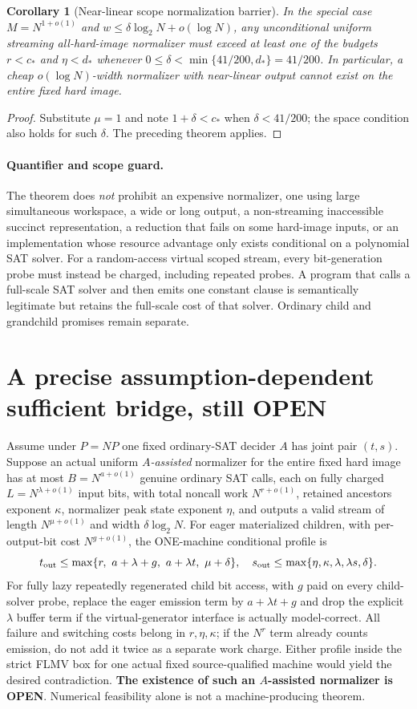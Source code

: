 \documentclass[11pt]{article}
\newtheorem{corollary}[theorem]{Corollary}
\begin{document}
\begin{corollary}[Near-linear scope normalization barrier]
In the special case $M=N^{1+o(1)}$ and
$w\le\delta\log_2N+o(\log N)$, any unconditional
uniform streaming all-hard-image normalizer must exceed at least
one of the budgets $r<c_*$ and $\eta<d_*$ whenever
$0\le\delta<\min\{41/200,d_*\}=41/200$.
In particular, a cheap $o(\log N)$-width normalizer with near-linear
output cannot exist on the entire fixed hard image.
\end{corollary}
\begin{proof}
Substitute $\mu=1$ and note $1+\delta<c_*$ when
$\delta<41/200$; the space condition also holds for such $\delta$.
The preceding theorem applies.
\end{proof}

\paragraph{Quantifier and scope guard.}
The theorem does \emph{not} prohibit an expensive normalizer, one
using large simultaneous workspace, a wide or long output, a
non-streaming inaccessible succinct representation, a reduction that
fails on some hard-image inputs, or an implementation whose resource
advantage only exists conditional on a polynomial SAT solver. For a
random-access virtual scoped stream, every bit-generation probe must
instead be charged, including repeated probes. A program that
calls a full-scale SAT solver and then emits one constant clause
is semantically legitimate but retains the full-scale cost of that
solver. Ordinary child and grandchild promises remain separate.

\section{A precise assumption-dependent sufficient bridge, still OPEN}
Assume under $P=NP$ one fixed ordinary-SAT decider $A$ has joint
pair $(t,s)$. Suppose an actual uniform \emph{$A$-assisted}
normalizer for the entire fixed hard image has at most
$B=N^{a+o(1)}$ genuine ordinary SAT calls, each on fully
charged $L=N^{\lambda+o(1)}$ input bits, with total noncall
work $N^{r+o(1)}$, retained ancestors exponent $\kappa$,
normalizer peak state exponent $\eta$, and outputs a valid
stream of length $N^{\mu+o(1)}$ and width $\delta\log_2N$.
For eager materialized children, with per-output-bit cost
$N^{g+o(1)}$, the ONE-machine conditional profile is
\[
 t_{\rm out}\le
 \max\{r,\ a+\lambda+g,\ a+\lambda t,\ \mu+\delta\},\quad
 s_{\rm out}\le
 \max\{\eta,\kappa,\lambda,\lambda s,\delta\}.
\]
For fully lazy repeatedly regenerated child bit access, with
$g$ paid on every child-solver probe, replace the eager
emission term by $a+\lambda t+g$ and drop the explicit
$\lambda$ buffer term if the virtual-generator interface is
actually model-correct. All failure and switching costs belong
in $r,\eta,\kappa$; if the $N^{r}$ term already counts emission,
do not add it twice as a separate work charge.
Either profile inside the strict FLMV box for one actual fixed
source-qualified machine would yield the desired contradiction.
\textbf{The existence of such an $A$-assisted normalizer is OPEN}.
Numerical feasibility alone is not a machine-producing theorem.
\end{document}
